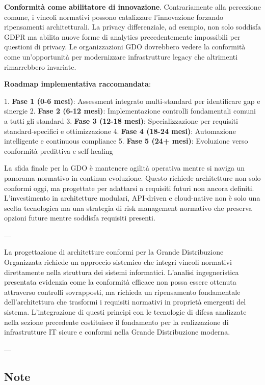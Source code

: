 {{\textbf{Conformità come abilitatore di innovazione}. Contrariamente alla percezione comune, i vincoli normativi possono catalizzare l'innovazione forzando ripensamenti architetturali. La privacy differenziale, ad esempio, non solo soddisfa GDPR ma abilita nuove forme di analytics precedentemente impossibili per questioni di privacy. Le organizzazioni GDO dovrebbero vedere la conformità come un'opportunità per modernizzare infrastrutture legacy che altrimenti rimarrebbero invariate.

\textbf{Roadmap implementativa raccomandata}:

1. \textbf{Fase 1 (0-6 mesi)}: Assessment integrato multi-standard per identificare gap e sinergie
2. \textbf{Fase 2 (6-12 mesi)}: Implementazione controlli fondamentali comuni a tutti gli standard
3. \textbf{Fase 3 (12-18 mesi)}: Specializzazione per requisiti standard-specifici e ottimizzazione
4. \textbf{Fase 4 (18-24 mesi)}: Automazione intelligente e continuous compliance
5. \textbf{Fase 5 (24+ mesi)}: Evoluzione verso conformità predittiva e self-healing

La sfida finale per la GDO è mantenere agilità operativa mentre si naviga un panorama normativo in continua evoluzione. Questo richiede architetture non solo conformi oggi, ma progettate per adattarsi a requisiti futuri non ancora definiti. L'investimento in architetture modulari, API-driven e cloud-native non è solo una scelta tecnologica ma una strategia di risk management normativo che preserva opzioni future mentre soddisfa requisiti presenti.

---

La progettazione di architetture conformi per la Grande Distribuzione Organizzata richiede un approccio sistemico che integri vincoli normativi direttamente nella struttura dei sistemi informatici. L'analisi ingegneristica presentata evidenzia come la conformità efficace non possa essere ottenuta attraverso controlli sovrapposti, ma richieda un ripensamento fondamentale dell'architettura che trasformi i requisiti normativi in proprietà emergenti del sistema. L'integrazione di questi principi con le tecnologie di difesa analizzate nella sezione precedente costituisce il fondamento per la realizzazione di infrastrutture IT sicure e conformi nella Grande Distribuzione moderna.

---

\subsection{Note}

}}
